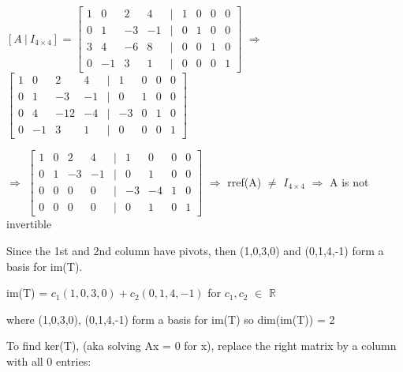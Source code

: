     \begin{tbox}
        $[A \ | \ I_{4 \times 4}]$ =
        \footnotesize
        $\begin{bmatrix}
            1 & 0 & 2 & 4 & | & 1 & 0 & 0 & 0 \\
            0 & 1 & -3 & -1 & | & 0 & 1 & 0 & 0 \\
            3 & 4 & -6 & 8 & | & 0 & 0 & 1 & 0 \\
            0 & -1 & 3 & 1 & | & 0 & 0 & 0 & 1
        \end{bmatrix}$
        $\Rightarrow$
        $\begin{bmatrix}
            1 & 0 & 2 & 4 & | & 1 & 0 & 0 & 0 \\
            0 & 1 & -3 & -1 & | & 0 & 1 & 0 & 0 \\
            0 & 4 & -12 & -4 & | & -3 & 0 & 1 & 0 \\
            0 & -1 & 3 & 1 & | & 0 & 0 & 0 & 1
        \end{bmatrix}$

        $\Rightarrow$
        $\begin{bmatrix}
            1 & 0 & 2 & 4 & | & 1 & 0 & 0 & 0 \\
            0 & 1 & -3 & -1 & | & 0 & 1 & 0 & 0 \\
            0 & 0 & 0 & 0 & | & -3 & -4 & 1 & 0 \\
            0 & 0 & 0 & 0 & | & 0 & 1 & 0 & 1
        \end{bmatrix}$
        $\Rightarrow$
        rref(A) $\not =$ $I_{4 \times 4}$
        $\Rightarrow$
        A is not invertible

        \vspace{0.3cm}

        Since the 1st and 2nd column have pivots,
        then (1,0,3,0) and (0,1,4,-1) form a basis for im(T).

        \hspace{0.5cm}
        im(T) = $c_1(1,0,3,0) + c_2(0,1,4,-1)$
        \hspace{0.5cm}
        for $c_1,c_2$ $\in$ $\mathbb{R}$

        \hspace{0.5cm}
        where (1,0,3,0), (0,1,4,-1) form a basis for im(T) so dim(im(T)) = 2

        \vspace{0.3cm}

        To find ker(T), (aka solving Ax = 0 for x),
        replace the right matrix by a column with all 0 entries:


\end{tbox}
